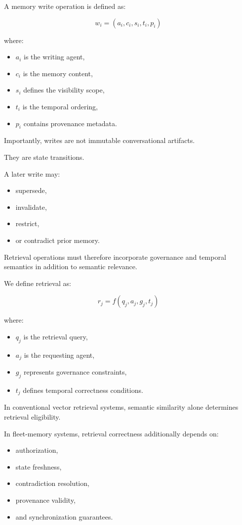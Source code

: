 \documentclass[10pt,twocolumn,letterpaper]{article}
\begin{document}
A memory write operation is defined as:

\[
w_i = (a_i, c_i, s_i, t_i, p_i)
\]

where:
\begin{itemize}
    \item \(a_i\) is the writing agent,
    \item \(c_i\) is the memory content,
    \item \(s_i\) defines the visibility scope,
    \item \(t_i\) is the temporal ordering,
    \item \(p_i\) contains provenance metadata.
\end{itemize}

Importantly, writes are not immutable conversational artifacts.

They are state transitions.

A later write may:
\begin{itemize}
    \item supersede,
    \item invalidate,
    \item restrict,
    \item or contradict prior memory.
\end{itemize}

Retrieval operations must therefore incorporate governance and temporal semantics in addition to semantic relevance.

We define retrieval as:

\[
r_j = f(q_j, a_j, g_j, t_j)
\]

where:
\begin{itemize}
    \item \(q_j\) is the retrieval query,
    \item \(a_j\) is the requesting agent,
    \item \(g_j\) represents governance constraints,
    \item \(t_j\) defines temporal correctness conditions.
\end{itemize}

In conventional vector retrieval systems, semantic similarity alone determines retrieval eligibility.

In fleet-memory systems, retrieval correctness additionally depends on:
\begin{itemize}
    \item authorization,
    \item state freshness,
    \item contradiction resolution,
    \item provenance validity,
    \item and synchronization guarantees.
\end{itemize}
\end{document}

